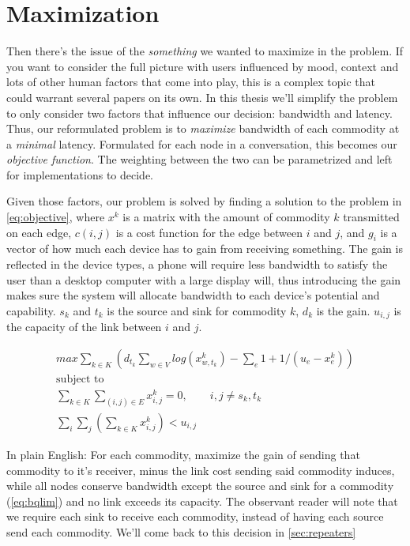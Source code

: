 \section{Maximization}

Then there's the issue of the \emph{something} we wanted to maximize in the problem. If you want to consider the full picture with users influenced by mood, context and lots of other human factors that come into play, this is a complex topic that could warrant several papers on its own. In this thesis we'll simplify the problem to only consider two factors that influence our decision: bandwidth and latency. Thus, our reformulated problem is to \emph{maximize} bandwidth of each commodity at a \emph{minimal} latency. Formulated for each node in a conversation, this becomes our \emph{objective function}. The weighting between the two can be parametrized and left for implementations to decide.

Given those factors, our problem is solved by finding a solution to the problem in \autoref{eq:objective}, where $x^k$ is a matrix with the amount of commodity $k$ transmitted on each edge, $c(i, j)$ is a cost function for the edge between $i$ and $j$, and $g_i$ is a vector of how much each device has to gain from receiving something. The gain is reflected in the device types, a phone will require less bandwidth to satisfy the user than a desktop computer with a large display will, thus introducing the gain makes sure the system will allocate bandwidth to each device's potential and capability. $s_k$ and $t_k$ is the source and sink for commodity $k$, $d_k$ is the gain. $u_{i, j}$ is the capacity of the link between $i$ and $j$.

\begin{gather}\label{eq:objective}
    max \sum_{k \in K} (d_{t_k} \sum_{w \in V} log(x_{w, t_k}^k) - \sum_e 1 + 1/(u_e - x_e^k))\\
    \text{subject to} \nonumber \\
    \sum_{k \in K} \sum_{(i, j) \in E} x_{i, j}^k = 0, \qquad{} i, j \neq s_k, t_k \\ \label{eq:bwlim}
    \sum_i \sum_j (\sum_{k \in K}x_{i, j}^k) < u_{i, j}
\end{gather}


In plain English: For each commodity, maximize the gain of sending that commodity to it's receiver, minus the link cost sending said commodity induces, while all nodes conserve bandwidth except the source and sink for a commodity (\autoref{eq:bqlim}) and no link exceeds its capacity. The observant reader will note that we require each sink to receive each commodity, instead of having each source send each commodity. We'll come back to this decision in \autoref{sec:repeaters}

